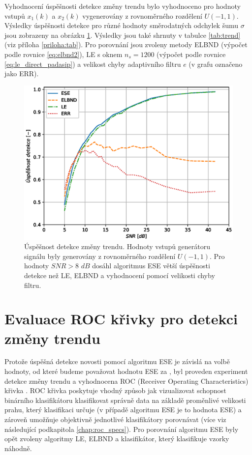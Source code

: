 Vyhodnocení úspěšnosti detekce změny trendu bylo vyhodnoceno pro hodnoty vstupů $x_1(k)$ a $x_2(k)$ vygenerovány z rovnoměrného rozdělení $U(-1,1)$. Výsledky úspěšnosti detekce pro různé hodnoty směrodatných odchylek šumu $\sigma$ jsou zobrazeny na obrázku \ref{fig:trend_stats}. Výsledky jsou také shrnuty v tabulce \ref{tab:trend} (viz příloha \ref{priloha:tab}). Pro porovnání jsou zvoleny metody ELBND (výpočet podle rovnice \ref{eq:elbnd2}), LE s oknem $n_s=1200$ (výpočet podle rovnice \ref{eq:le_direct_padasip}) a velikost chyby adaptivního filtru $e$ (v grafu označeno jako ERR).

\begin{figure}[!ht]
    \centering
    \includegraphics[scale=0.66]{IMG/mdpi/trendchange_stats.eps}
    \caption{Úspěšnost detekce změny trendu. Hodnoty vstupů generátoru signálu byly generovány z rovnoměrného rozdělení $U(-1,1)$. Pro hodnoty $SNR > 8$ $dB$ dosáhl algoritmus ESE větší úspěšnosti detekce než LE, ELBND a vyhodnocení pomocí velikosti chyby filtru.}
    \label{fig:trend_stats}
\end{figure}


\section{Evaluace ROC křivky pro detekci změny trendu}\label{chap:appel_roc}
Protože úspěšná detekce novosti pomocí algoritmu ESE je závislá na volbě hodnoty, od které budeme považovat hodnotu ESE za , byl proveden experiment detekce změny trendu a vyhodnocena ROC (Receiver Operating Characteristics) křivka \cite{roc_orig}. ROC křivka poskytuje vhodný způsob jak vizualizovat schopnost binárního klasifikátoru klasifikovat správně data na základě proměnlivé velikosti prahu, který klasifikaci určuje (v případě algoritmu ESE je to hodnota ESE) a zároveň umožňuje objektivně jednotlivé klasifikátory porovnávat \cite{roc_bible} (více viz následující podkapitola \ref{chap:roc_specs}). Pro porovnání algoritmu ESE byly opět zvoleny algoritmy LE, ELBND a klasifikátor, který klasifikuje vzorky náhodně.
